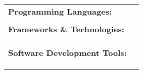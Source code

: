 \begin{cventries}
	\cventry
	{}
	{}
	{}
	{}
	{\def\arraystretch{1.15}{\begin{tabular}{ l l }
		\textbf{Programming Languages:}  & {\skill{\hspace{1cm} \textbf{JavaScript, Python, C, C++, Java}}} \\ \\
		\textbf{Frameworks \& Technologies:}  & {\skill{\hspace{1cm} \textbf{JavaScript} (React Native, ReactJS, Redux, NodeJS, jQuery, JSON)}} \\
		  & {\skill{\hspace{1cm} \textbf{Python} (errbot, BeautifulSoup)}} \\
		  & {\skill{\hspace{1cm} \textbf{REST, GraphQL, SQL, CSS} (Bootstrap, SASS), \textbf{HTML, etc.}}} \\ \\
		\textbf{Software Development Tools:}  & {\skill{\hspace{1cm} \textbf{npm} (node package manager), \textbf{git} (GitHub, GitLab)}} \\
		  & {\skill{\hspace{1cm} \textbf{Firebase \& Google Cloud Interface, Amazon Web Services}}} \\
		  & {\skill{\hspace{1cm} \textbf{Continuous Integration} (TravisCI, CircleCI, Codecov)}} \\
		  & {\skill{\hspace{1cm} \textbf{Linting} (ESLint, coala), \textbf{Heroku, bower, gulp, yarn, etc.}}} \\
		\end{tabular}}}
\end{cventries}